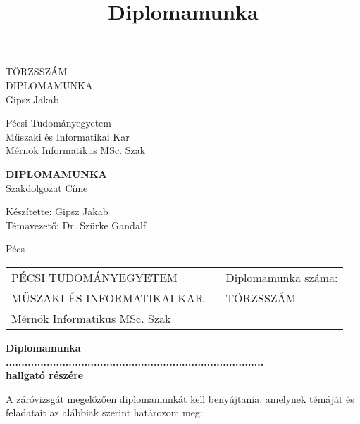 \documentclass[oneside,a4paper,12pt]{article}
\title {Diplomamunka}
\begin{document}
	\thispagestyle{empty}
	\begin{center}
		\LARGE
		TÖRZSSZÁM\\
		\Huge
		\vspace{80mm}
		DIPLOMAMUNKA\\
		\vspace{90mm}
		\Large
		Gipsz Jakab\\
	\end{center}
	\pagebreak
	\thispagestyle{empty}
	\begin{center}
		\Large
		\begin{spacing}{1}
			Pécsi Tudományegyetem\\
			Műszaki és Informatikai Kar\\
			Mérnök Informatikus MSc. Szak\\
		\end{spacing}
		\Huge
		\vspace{80mm}
		{\bf DIPLOMAMUNKA}\\
		\bigskip
		\Large
		Szakdolgozat Címe\\
		\vspace{60mm}
		\Large
		\begin{spacing}{1}
			Készítette: Gipsz Jakab\\
			Témavezető: Dr. Szürke Gandalf\\
		\end{spacing}
		\bigskip
		\bigskip
		Pécs
	\end{center}
	
	\pagebreak
	\thispagestyle{empty}
	
	\begin{center}
		\bf
		\begin{tabularx}{\textwidth}{
				>{\hsize=0.5\hsize}X
				>{\hsize=0.2\hsize}X
				>{\hsize=0.3\hsize}X}
			PÉCSI TUDOMÁNYEGYETEM & & Diplomamunka száma:\\
			MŰSZAKI ÉS INFORMATIKAI KAR & & TÖRZSSZÁM\\
			Mérnök Informatikus MSc. Szak & & \\
		\end{tabularx}
	\end{center}
	\vspace{20mm}
	\begin{center}
		\bf
		Diplomamunka\\
		\bigskip\bigskip
		..................................................................................\\
		hallgató részére
		\bigskip\bigskip
	\end{center}
	\noindent
	A záróvizsgát megelőzően diplomamunkát kell benyújtania, amelynek témáját és feladatait az alábbiak szerint határozom meg:\\
	
\end{document}
